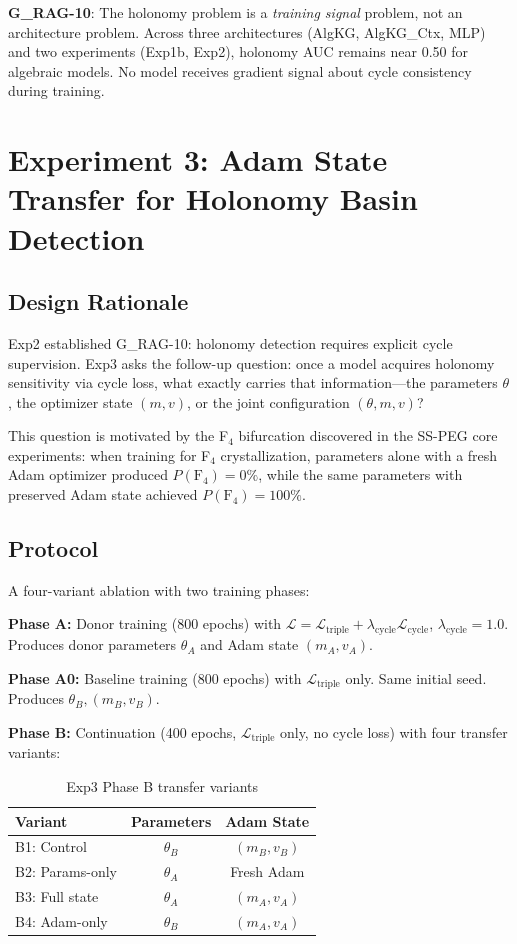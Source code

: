 \documentclass[11pt,letterpaper]{article}
\newcommand{\KL}{\mathcal{L}}
\begin{document}
\textbf{G\_RAG-10}: The holonomy problem is a \textit{training signal} problem, not an architecture problem. Across three architectures (AlgKG, AlgKG\_Ctx, MLP) and two experiments (Exp1b, Exp2), holonomy AUC remains near 0.50 for algebraic models. No model receives gradient signal about cycle consistency during training.

\section{Experiment 3: Adam State Transfer for Holonomy Basin Detection}

\subsection{Design Rationale}

Exp2 established G\_RAG-10: holonomy detection requires explicit cycle supervision. Exp3 asks the follow-up question: once a model acquires holonomy sensitivity via cycle loss, what exactly carries that information---the parameters $\theta$, the optimizer state $(m, v)$, or the joint configuration $(\theta, m, v)$?

This question is motivated by the F$_4$ bifurcation discovered in the SS-PEG core experiments: when training for F$_4$ crystallization, parameters alone with a fresh Adam optimizer produced $P(\text{F}_4) = 0\%$, while the same parameters with preserved Adam state achieved $P(\text{F}_4) = 100\%$.

\subsection{Protocol}

A four-variant ablation with two training phases:

\textbf{Phase A:} Donor training (800 epochs) with $\KL = \KL_{\text{triple}} + \lambda_{\text{cycle}} \KL_{\text{cycle}}$, $\lambda_{\text{cycle}} = 1.0$. Produces donor parameters $\theta_A$ and Adam state $(m_A, v_A)$.

\textbf{Phase A0:} Baseline training (800 epochs) with $\KL_{\text{triple}}$ only. Same initial seed. Produces $\theta_B, (m_B, v_B)$.

\textbf{Phase B:} Continuation (400 epochs, $\KL_{\text{triple}}$ only, no cycle loss) with four transfer variants:

\begin{table}[H]
\centering
\caption{Exp3 Phase B transfer variants}
\begin{tabular}{@{}lcc@{}}
\toprule
\textbf{Variant} & \textbf{Parameters} & \textbf{Adam State} \\
\midrule
B1: Control & $\theta_B$ & $(m_B, v_B)$ \\
B2: Params-only & $\theta_A$ & Fresh Adam \\
B3: Full state & $\theta_A$ & $(m_A, v_A)$ \\
B4: Adam-only & $\theta_B$ & $(m_A, v_A)$ \\
\bottomrule
\end{tabular}
\end{table}
\end{document}
